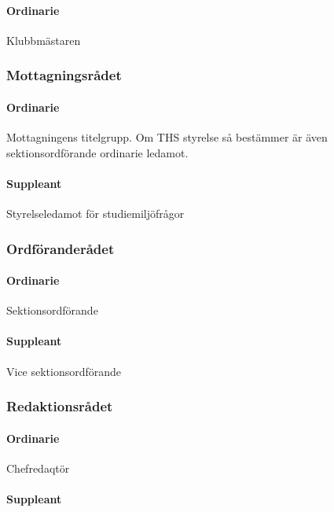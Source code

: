 \documentclass{dgovdoc}
\begin{document}
\paragraph{Ordinarie}

Klubbmästaren

\subsubsection{Mottagningsrådet}

\paragraph{Ordinarie}

Mottagningens titelgrupp. Om THS styrelse så bestämmer är även
sektionsordförande ordinarie ledamot.

\paragraph{Suppleant}

Styrelseledamot för studiemiljöfrågor

\subsubsection{Ordföranderådet}

\paragraph{Ordinarie}

Sektionsordförande

\paragraph{Suppleant}

Vice sektionsordförande

\subsubsection{Redaktionsrådet}

\paragraph{Ordinarie}

Chefredaqtör

\paragraph{Suppleant}
\end{document}
